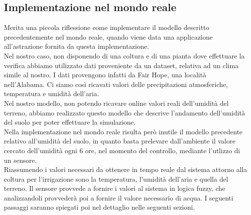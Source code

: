 \documentclass[conference,10pt]{IEEEtran}
\begin{document}
\subsection{Implementazione nel mondo reale}\label{sec:symo}
Merita una piccola riflessione come implementare il modello descritto precedentemente nel mondo reale, quando viene data una applicazione all'astrazione fornita da questa implementazione.\\
Nel nostro caso, non disponendo di una coltura e di una pianta dove effettuare la verifica abbiamo utilizzato dati proveniente da un dataset, relativa ad un clima simile al nostro. I dati provengono infatti da Fair Hope, una località nell'Alabama.  Ci siamo così ricavati valori delle precipitazioni atmosferiche, temperatura e umidità dell'aria.\\
Nel nostro modello, non potendo ricavare online valori reali dell'umidità del terreno, abbiamo realizzato questo modello che descrive l'andamento dell'umidità del suolo per poter effettuare la simulazione.\\
Nella implementazione nel mondo reale risulta però inutile il modello precedente relativo all'umidità del suolo, in quanto basta prelevare dall'ambiente il valore cercato dell'umidità ogni 6 ore, nel momento del controllo, mediante l'utlizzo di un sensore.\\
Riassumendo i valori necessari da ottenere in tempo reale dal sistema attorno alla coltura per l'irrigazione sono la temperatura, l'umidità dell'aria e quella del terreno.
Il sensore provvede a fornire i valori al sistema in logica fuzzy, che analizzandoli  provvederà poi a fornire il valore necessario di acqua. I seguenti passaggi saranno spiegati poi nel dettaglio nelle seguenti sezioni.


\end{document}
